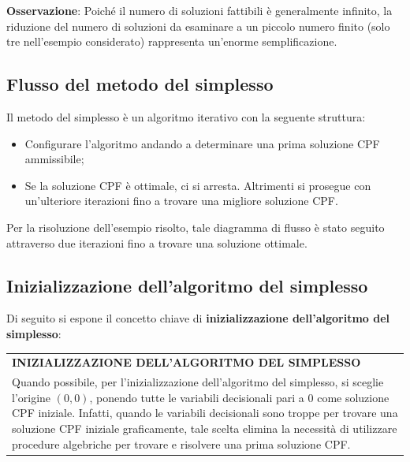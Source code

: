 \documentclass[a4paper]{extarticle}
\renewcommand\arraystretch{}
\begin{document}
\vspace{1em}
\noindent
\textbf{Osservazione}: Poiché il numero di soluzioni fattibili è generalmente infinito, la riduzione del numero di soluzioni da esaminare a un piccolo numero finito (solo tre nell'esempio considerato) rappresenta un'enorme semplificazione.

\vspace{1em}
\subsection{Flusso del metodo del simplesso}
Il metodo del simplesso è un algoritmo iterativo con la seguente struttura:
\begin{itemize}
    \item Configurare l'algoritmo andando a determinare una prima soluzione CPF ammissibile;
    \item Se la soluzione CPF è ottimale, ci si arresta. Altrimenti si prosegue con un'ulteriore iterazioni fino a trovare una migliore soluzione CPF.
\end{itemize}
Per la risoluzione dell'esempio risolto, tale diagramma di flusso è stato seguito attraverso due iterazioni fino a trovare una soluzione ottimale.

\vspace{1em}
\noindent
\subsection{Inizializzazione dell'algoritmo del simplesso}
Di seguito si espone il concetto chiave di \textbf{inizializzazione dell'algoritmo del simplesso}:

\vspace{1em}
\setlength{\tabcolsep}{14pt}
\renewcommand{\arraystretch}{2}
\noindent
\begin{tabularx}{\textwidth}{@{}|P|@{}}
    \hline
    {\textbf{INIZIALIZZAZIONE DELL'ALGORITMO DEL SIMPLESSO}}\\
    \parbox{\linewidth}{Quando possibile, per l'inizializzazione dell'algoritmo del simplesso, si sceglie l'origine $(0,0)$, ponendo tutte le variabili decisionali pari a $0$ come soluzione CPF iniziale.\\
    Infatti, quando le variabili decisionali sono troppe per trovare una soluzione CPF iniziale graficamente, tale scelta elimina la necessità di utilizzare procedure algebriche per trovare e risolvere una prima soluzione CPF. \vspace{3mm}}\\
    \hline
\end{tabularx}
\end{document}
